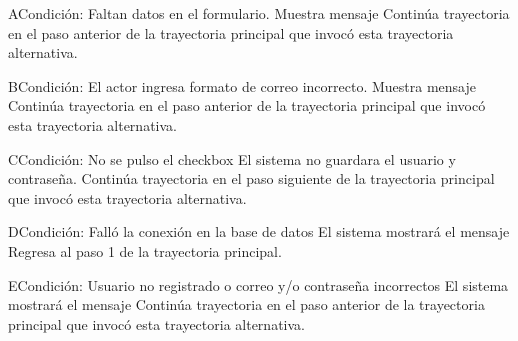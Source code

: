 	\begin{UCtrayectoriaA}{A}{Condición: Faltan datos en el formulario.}
		\UCpaso[\UCsist] Muestra mensaje 
		\UCpaso[\UCsist] Continúa trayectoria en el paso anterior de la trayectoria principal que invocó esta trayectoria alternativa. 
	\end{UCtrayectoriaA}
	\begin{UCtrayectoriaA}{B}{Condición: El actor ingresa formato de correo incorrecto.}
		\UCpaso[\UCsist] Muestra mensaje 
		\UCpaso[\UCsist] Continúa trayectoria en el paso anterior de la trayectoria principal que invocó esta trayectoria alternativa. 
	\end{UCtrayectoriaA}
	\begin{UCtrayectoriaA}{C}{Condición: No se pulso el checkbox}
		\UCpaso[\UCsist] El sistema no guardara el usuario y contraseña. 
		\UCpaso[\UCsist] Continúa trayectoria en el paso siguiente de la trayectoria principal que invocó esta trayectoria alternativa. 
	\end{UCtrayectoriaA}
	\begin{UCtrayectoriaA}{D}{Condición: Falló la conexión en la base de datos}
		\UCpaso[\UCsist] El sistema mostrará el mensaje 
		\UCpaso[\UCsist] Regresa al paso 1 de la trayectoria principal. 
	\end{UCtrayectoriaA}
		\begin{UCtrayectoriaA}{E}{Condición: Usuario no registrado o correo y/o contraseña incorrectos}
			\UCpaso[\UCsist] El sistema mostrará el mensaje 
			\UCpaso[\UCsist] Continúa trayectoria en el paso anterior de la trayectoria principal que invocó esta trayectoria alternativa. 
	\end{UCtrayectoriaA}
